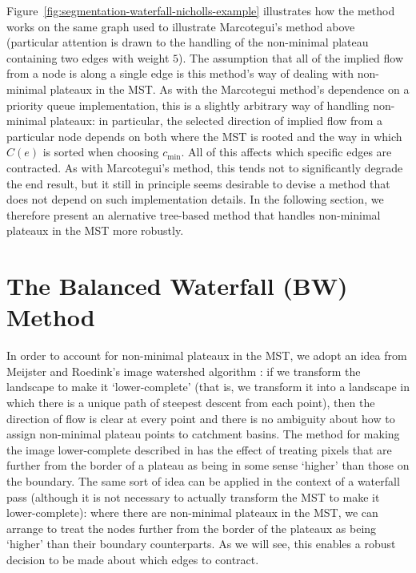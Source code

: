 \documentclass[preprint,a4paper]{elsarticle}
\begin{document}
%
Figure~\ref{fig:segmentation-waterfall-nicholls-example} illustrates how the method works on the same graph used to illustrate Marcotegui's method above (particular attention is drawn to the handling of the non-minimal plateau containing two edges with weight $5$). The assumption that all of the implied flow from a node is along a single edge is this method's way of dealing with non-minimal plateaux in the MST. As with the Marcotegui method's dependence on a priority queue implementation, this is a slightly arbitrary way of handling non-minimal plateaux: in particular, the selected direction of implied flow from a particular node depends on both where the MST is rooted and the way in which $C(e)$ is sorted when choosing $c_{\min}$. All of this affects which specific edges are contracted. As with Marcotegui's method, this tends not to significantly degrade the end result, but it still in principle seems desirable to devise a method that does not depend on such implementation details. In the following section, we therefore present an alernative tree-based method that handles non-minimal plateaux in the MST more robustly.


\section{The Balanced Waterfall (BW) Method}
\label{sec:golodetz}

In order to account for non-minimal plateaux in the MST, we adopt an idea from Meijster and Roedink's image watershed algorithm \cite{meijster98}: if we transform the landscape to make it `lower-complete' (that is, we transform it into a landscape in which there is a unique path of steepest descent from each point), then the direction of flow is clear at every point and there is no ambiguity about how to assign non-minimal plateau points to catchment basins. The method for making the image lower-complete described in \cite{meijster98} has the effect of treating pixels that are further from the border of a plateau as being in some sense `higher' than those on the boundary. The same sort of idea can be applied in the context of a waterfall pass (although it is not necessary to actually transform the MST to make it lower-complete): where there are non-minimal plateaux in the MST, we can arrange to treat the nodes further from the border of the plateaux as being `higher' than their boundary counterparts. As we will see, this enables a robust decision to be made about which edges to contract.
\end{document}
